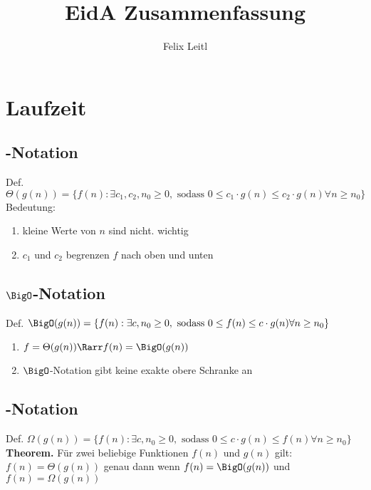 \documentclass[a4paper]{article}
\title{EidA Zusammenfassung}
\author{Felix Leitl}
\begin{document}
	\maketitle
	\tableofcontents
	\newpage
	\section{Laufzeit}
	\subsection{\Theta-Notation}Def. $\Theta(g(n))=\{f(n):\exists c_1,c_2,n_0\geq 0, \text{ sodass } 0\leq c_1\cdot g(n)\leq c_2\cdot g(n)\forall n \geq n_0\}$ \newline \newline
		Bedeutung: 	
		\begin{enumerate}
		\item kleine Werte von $n$ sind nicht. wichtig
		\item $c_1$ und $c_2$ begrenzen $f$ nach oben und unten
	\end{enumerate} 
	\subsection{$\BigO$-Notation}
		Def. $\BigO(g(n))=\{f(n):\exists c,n_0\geq 0, \text{ sodass }0\leq f(n)\leq c\cdot g(n)\forall n\geq n_0\}$	 \newline \newline
		\begin{enumerate}
			\item $f=\Theta(g(n))\Rarr f(n)=\BigO(g(n))$
			\item $\BigO$-Notation gibt keine exakte obere Schranke an
		\end{enumerate}
		\subsection{\Omega-Notation}
			Def. $\Omega(g(n))=\{f(n):\exists c,n_0\geq 0, \text{ sodass } 0\leq c\cdot g(n)\leq f(n)\forall n\geq n_0\}$ \newline \newline
		\textbf{Theorem.} Für zwei beliebige Funktionen $f(n)$ und $g(n)$ gilt: $f(n) = \Theta(g(n))$ genau dann wenn $f(n)=\BigO(g(n))$ und $f(n)=\Omega(g(n))$
\end{document}
